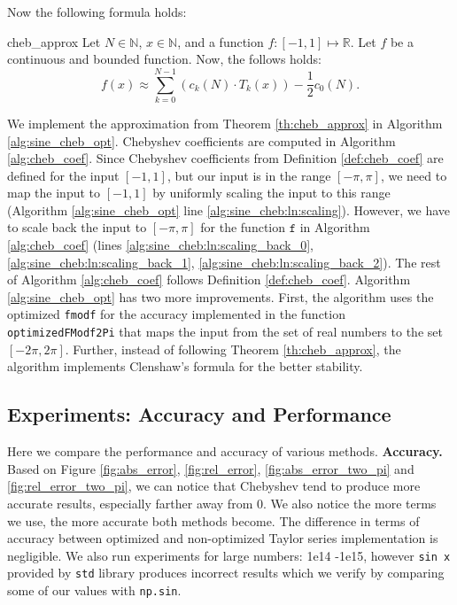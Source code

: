 \documentclass[12pt]{article}
\begin{document}
Now the following formula holds:
\begin{TheoremColor}{}{cheb_approx}
    Let $N \in \mathbb{N}$, $x \in \mathbb{N}$, and a function $f : [-1, 1] \mapsto \mathbb{R}$.
    Let $f$ be a continuous and bounded function. Now, the follows holds:
    \begin{equation*}
        f(x) \approx \sum_{k=0}^{N-1} \left(c_k(N) \cdot T_k(x)\right) - \frac{1}{2} c_0(N).
    \end{equation*}
\end{TheoremColor}

We implement the approximation from Theorem \ref{th:cheb_approx} in Algorithm \ref{alg:sine_cheb_opt}.
Chebyshev coefficients are computed in Algorithm \ref{alg:cheb_coef}.
Since Chebyshev coefficients from Definition \ref{def:cheb_coef} are defined for the input $[-1, 1]$, but our input is in the range $[-\pi, \pi]$, we need to map the input to $[-1, 1]$ by uniformly scaling the input to this range (Algorithm \ref{alg:sine_cheb_opt} line \ref{alg:sine_cheb:ln:scaling}).
However, we have to scale back the input to $[-\pi, \pi]$ for the function $\texttt{f}$ in Algorithm \ref{alg:cheb_coef} (lines \ref{alg:sine_cheb:ln:scaling_back_0}, \ref{alg:sine_cheb:ln:scaling_back_1}, \ref{alg:sine_cheb:ln:scaling_back_2}).
The rest of Algorithm \ref{alg:cheb_coef} follows Definition \ref{def:cheb_coef}.
Algorithm \ref{alg:sine_cheb_opt} has two more improvements.
First, the algorithm uses the optimized \texttt{fmodf} for the accuracy implemented in the function \texttt{optimizedFModf2Pi} that maps the input from the set of real numbers to the set $[-2 \pi, 2 \pi]$.
Further, instead of following Theorem \ref{th:cheb_approx}, the algorithm implements Clenshaw's formula \cite[p~.237]{press2007numerical} for the better stability.


\newpage
\subsection{Experiments: Accuracy and Performance}
Here we compare the performance and accuracy of various methods.
\textbf{Accuracy.}
Based on Figure \ref{fig:abs_error}, \ref{fig:rel_error}, \ref{fig:abs_error_two_pi} and \ref{fig:rel_error_two_pi}, we can notice that Chebyshev tend to produce more accurate results, especially farther away from 0. We also notice the more terms we use, the more accurate both methods become. The difference in terms of accuracy between optimized and non-optimized Taylor series implementation is negligible.
We also run experiments for large numbers: 1e14 -1e15, however \texttt{sin x} provided by \texttt{std} library produces incorrect results which we verify by comparing some of our values with \texttt{np.sin}.
\end{document}
